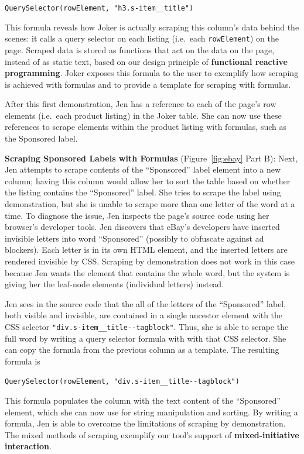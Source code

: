 \documentclass[sigconf,10pt]{acmart}
\begin{document}
\texttt{QuerySelector(rowElement,\ "h3.s-item\_\_title")}

This formula reveals how Joker is actually scraping this column's data
behind the scenes: it calls a query selector on each listing (i.e.~each
\texttt{rowElement}) on the page. Scraped data is stored as functions
that act on the data on the page, instead of as static text, based on
our design principle of \textbf{functional reactive programming}. Joker
exposes this formula to the user to exemplify how scraping is achieved
with formulas and to provide a template for scraping with formulas.

After this first demonstration, Jen has a reference to each of the
page's row elements (i.e.~each product listing) in the Joker table. She
can now use these references to scrape elements within the product
listing with formulas, such as the Sponsored label.

\textbf{Scraping Sponsored Labels with Formulas} (Figure~\ref{fig:ebay}
Part B): Next, Jen attempts to scrape contents of the ``Sponsored''
label element into a new column; having this column would allow her to
sort the table based on whether the listing contains the ``Sponsored''
label. She tries to scrape the label using demonstration, but she is
unable to scrape more than one letter of the word at a time. To diagnose
the issue, Jen inspects the page's source code using her browser's
developer tools. Jen discovers that eBay's developers have inserted
invisible letters into word ``Sponsored'' (possibly to obfuscate against
ad blockers). Each letter is in its own HTML element, and the inserted
letters are rendered invisible by CSS. Scraping by demonstration does
not work in this case because Jen wants the element that contains the
whole word, but the system is giving her the leaf-node elements
(individual letters) instead.

Jen sees in the source code that the all of the letters of the
``Sponsored'' label, both visible and invisible, are contained in a
single ancestor element with the CSS selector
\texttt{"div.s-item\_\_title-\/-tagblock"}. Thus, she is able to scrape
the full word by writing a query selector formula with with that CSS
selector. She can copy the formula from the previous column as a
template. The resulting formula is

\texttt{QuerySelector(rowElement,\ "div.s-item\_\_title-\/-tagblock")}

This formula populates the column with the text content of the
``Sponsored'' element, which she can now use for string manipulation and
sorting. By writing a formula, Jen is able to overcome the limitations
of scraping by demonstration. The mixed methods of scraping exemplify
our tool's support of \textbf{mixed-initiative interaction}.
\end{document}
